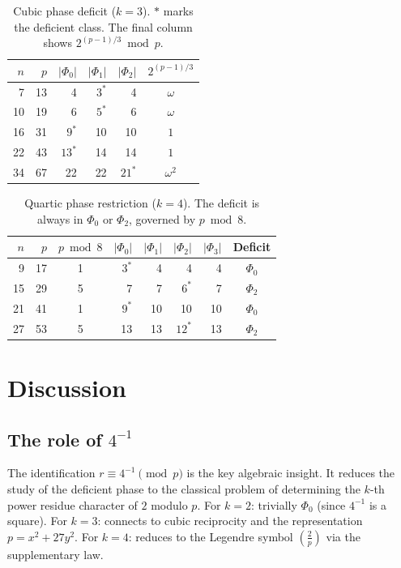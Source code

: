 \documentclass[11pt, a4paper]{article}
\theoremstyle{definition}
\theoremstyle{remark}
\newcommand{\Leg}[2]{\left(\frac{#1}{#2}\right)}
\begin{document}
\begin{table}[H]
\centering
\caption{Cubic phase deficit ($k = 3$).
$*$ marks the deficient class.
The final column shows $2^{(p-1)/3} \bmod p$.}
\label{tab:cubic}
\medskip
\begin{tabular}{@{}r r r r r c@{}}
\toprule
$n$ & $p$ & $|\Phi_0|$ & $|\Phi_1|$ & $|\Phi_2|$
& $2^{(p-1)/3}$ \\
\midrule
 7 & 13 &  4  & $3^*$ &  4 & $\omega$ \\
10 & 19 &  6  & $5^*$ &  6 & $\omega$ \\
16 & 31 & $9^*$ & 10  & 10 & $1$ \\
22 & 43 & $13^*$ & 14 & 14 & $1$ \\
34 & 67 & 22 & 22 & $21^*$ & $\omega^2$ \\
\bottomrule
\end{tabular}
\end{table}

\begin{table}[H]
\centering
\caption{Quartic phase restriction ($k = 4$).
The deficit is always in $\Phi_0$ or $\Phi_2$,
governed by $p \bmod 8$.}
\label{tab:quartic}
\medskip
\begin{tabular}{@{}r r c r r r r c@{}}
\toprule
$n$ & $p$ & $p\!\bmod 8$ &
$|\Phi_0|$ & $|\Phi_1|$ & $|\Phi_2|$ & $|\Phi_3|$ &
Deficit \\
\midrule
 9 & 17 & 1 & $3^*$ & 4 & 4 & 4 & $\Phi_0$ \\
15 & 29 & 5 & 7 & 7 & $6^*$ & 7 & $\Phi_2$ \\
21 & 41 & 1 & $9^*$ & 10 & 10 & 10 & $\Phi_0$ \\
27 & 53 & 5 & 13 & 13 & $12^*$ & 13 & $\Phi_2$ \\
\bottomrule
\end{tabular}
\end{table}

\section{Discussion}\label{sec:discussion}

\subsection{The role of $4^{-1}$}

The identification $r \equiv 4^{-1} \pmod{p}$ is the
key algebraic insight.
It reduces the study of the deficient phase to the
classical problem of determining the $k$-th power
residue character of $2$ modulo $p$.
For $k = 2$: trivially $\Phi_0$ (since $4^{-1}$ is a square).
For $k = 3$: connects to cubic reciprocity and
the representation $p = x^2 + 27y^2$.
For $k = 4$: reduces to the Legendre symbol
$\Leg{2}{p}$ via the supplementary law.
\end{document}

